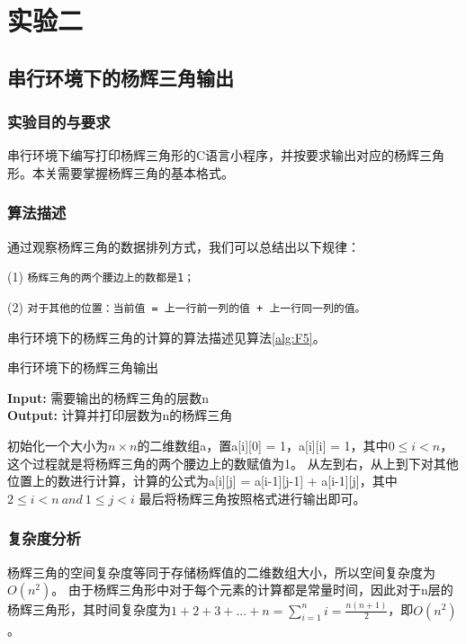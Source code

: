 \documentclass[supercite]{Experimental_Report}
\theoremstyle{definition}
\begin{document}
\newpage
\section{实验二}
\subsection{串行环境下的杨辉三角输出}
\subsubsection{实验目的与要求}
串行环境下编写打印杨辉三角形的C语言小程序，并按要求输出对应的杨辉三角形。本关需要掌握杨辉三角的基本格式。

\subsubsection{算法描述}
通过观察杨辉三角的数据排列方式，我们可以总结出以下规律：

(1) \texttt{杨辉三角的两个腰边上的数都是1；}

(2) \texttt{对于其他的位置：当前值 = 上一行前一列的值 + 上一行同一列的值。}

串行环境下的杨辉三角的计算的算法描述见算法\ref{alg:F5}。

\begin{algorithm}[htb]
\caption{串行环境下的杨辉三角输出}
\label{alg:F5}
\hspace*{0.02in} {\bf Input:}
需要输出的杨辉三角的层数n\\
\hspace*{0.02in} {\bf Output:} 
计算并打印层数为n的杨辉三角
  \begin{algorithmic}[1]
    \State
        初始化一个大小为$n\times n$的二维数组a，置a[i][0] = 1，a[i][i] = 1，其中$0\le i < n$，这个过程就是将杨辉三角的两个腰边上的数赋值为1。
    \State
        从左到右，从上到下对其他位置上的数进行计算，计算的公式为a[i][j] = a[i-1][j-1] + a[i-1][j]，其中$2 \le i < n\ and\ 1 \le j < i$
    \State
        最后将杨辉三角按照格式进行输出即可。
  \end{algorithmic}
\end{algorithm}

\subsubsection{复杂度分析}
杨辉三角的空间复杂度等同于存储杨辉值的二维数组大小，所以空间复杂度为$O(n^2)$。
由于杨辉三角形中对于每个元素的计算都是常量时间，因此对于n层的杨辉三角形，其时间复杂度为$1+2+3+...+n=\sum_{i=1}^{n}i = \frac{n(n+1)}{2}$，即$O(n^2)$。
\end{document}
